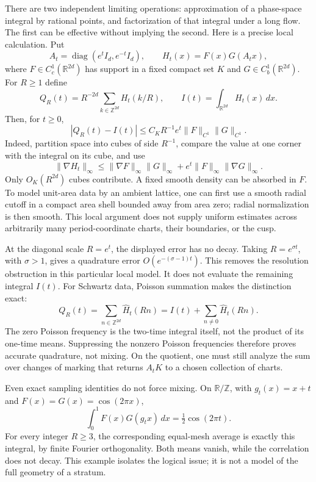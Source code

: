 There are two independent limiting operations: approximation of a phase-space
integral by rational points, and factorization of that integral under a long
flow.  The first can be effective without implying the second.
Here is a precise local calculation.  Put
\[
 A_t=\operatorname{diag}(e^t I_d,e^{-t}I_d),\qquad
 H_t(x)=F(x)G(A_tx),
\]
where $F\in C_c^1(\mathbb R^{2d})$ has support in a fixed compact set $K$ and
$G\in C_b^1(\mathbb R^{2d})$.  For $R\geq1$ define
\[
 Q_R(t)=R^{-2d}\sum_{k\in\mathbb Z^{2d}}H_t(k/R),\qquad
 I(t)=\int_{\mathbb R^{2d}}H_t(x)\,dx.
\]
Then, for $t\geq0$,
\begin{equation}\label{eq:pairquadrature}
 |Q_R(t)-I(t)|\leq C_K R^{-1}e^t
       \|F\|_{C^1}\|G\|_{C^1}.
\end{equation}
Indeed, partition space into cubes of side $R^{-1}$, compare the value at one
corner with the integral on its cube, and use
\[
 \|\nabla H_t\|_\infty
 \leq \|\nabla F\|_\infty\|G\|_\infty
       +e^t\|F\|_\infty\|\nabla G\|_\infty.
\]
Only $O_K(R^{2d})$ cubes contribute.  A fixed smooth density can be absorbed
in $F$.  To model unit-area data by an ambient lattice, one can first use a
smooth radial cutoff in a compact area shell bounded away from area zero;
radial normalization is then smooth.  This local argument does not supply
uniform estimates across arbitrarily many period-coordinate charts, their
boundaries, or the cusp.

At the diagonal scale $R=e^t$, the displayed error has no decay.
Taking $R=e^{\sigma t}$, with $\sigma>1$, gives a quadrature error
$O(e^{-(\sigma-1)t})$.  This removes the resolution obstruction in this
particular local model.  It does not evaluate the remaining integral $I(t)$.
For Schwartz data, Poisson summation makes the distinction exact:
\begin{equation}\label{eq:pairpoissonzero}
 Q_R(t)=\sum_{n\in\mathbb Z^{2d}}\widehat H_t(Rn)
       =I(t)+\sum_{n\ne0}\widehat H_t(Rn).
\end{equation}
The zero Poisson frequency is the two-time integral itself, not the product
of its one-time means.  Suppressing the nonzero Poisson frequencies therefore
proves accurate quadrature, not mixing.  On the quotient, one must still
analyze the sum over changes of marking that returns $A_tK$ to a chosen
collection of charts.

Even exact sampling identities do not force mixing.  On
$\mathbb R/\mathbb Z$, with $g_t(x)=x+t$ and
$F(x)=G(x)=\cos(2\pi x)$,
\[
 \int_0^1F(x)G(g_tx)\,dx=\tfrac12\cos(2\pi t).
\]
For every integer $R\geq3$, the corresponding equal-mesh average is exactly
this integral, by finite Fourier orthogonality.  Both means vanish, while the
correlation does not decay.  This example isolates the logical issue; it is
not a model of the full geometry of a stratum.



